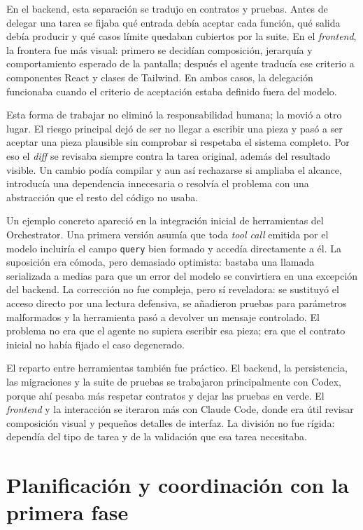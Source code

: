 En el backend, esta separación se tradujo en contratos y pruebas. Antes de
delegar una tarea se fijaba qué entrada debía aceptar cada función, qué salida
debía producir y qué casos límite quedaban cubiertos por la suite. En el
\textit{frontend}, la frontera fue más visual: primero se decidían composición,
jerarquía y comportamiento esperado de la pantalla; después el agente traducía
ese criterio a componentes React y clases de Tailwind. En ambos casos, la
delegación funcionaba cuando el criterio de aceptación estaba definido fuera del
modelo.

Esta forma de trabajar no eliminó la responsabilidad humana; la movió a
otro lugar. El riesgo principal dejó de ser no llegar a escribir una pieza y
pasó a ser aceptar una pieza plausible sin comprobar si respetaba el sistema
completo. Por eso el \textit{diff} se revisaba siempre contra la tarea
original, además del resultado visible. Un cambio podía compilar y aun
así rechazarse si ampliaba el alcance, introducía una dependencia innecesaria o
resolvía el problema con una abstracción que el resto del código no usaba.

Un ejemplo concreto apareció en la integración inicial de herramientas del
Orchestrator. Una primera versión asumía que toda \textit{tool call} emitida por
el modelo incluiría el campo \texttt{query} bien formado y accedía directamente a
él. La suposición era cómoda, pero demasiado optimista: bastaba una llamada
serializada a medias para que un error del modelo se convirtiera en una
excepción del backend. La corrección no fue compleja, pero sí reveladora: se
sustituyó el acceso directo por una lectura defensiva, se añadieron pruebas para
parámetros malformados y la herramienta pasó a devolver un mensaje controlado.
El problema no era que el agente no supiera escribir esa pieza; era que el
contrato inicial no había fijado el caso degenerado.

El reparto entre herramientas también fue práctico. El backend, la persistencia,
las migraciones y la suite de pruebas se trabajaron principalmente con Codex,
porque ahí pesaba más respetar contratos y dejar las pruebas en verde. El
\textit{frontend} y la interacción se iteraron más con Claude Code, donde
era útil revisar composición visual y pequeños detalles de interfaz. La
división no fue rígida: dependía del tipo de tarea y de la validación que esa
tarea necesitaba.

\section{Planificación y coordinación con la primera fase}

